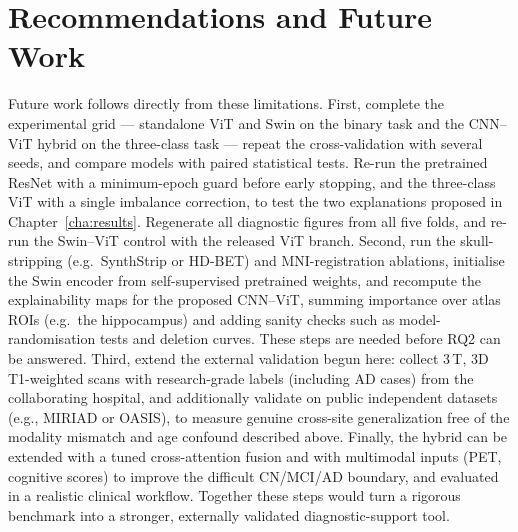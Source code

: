 \section{Recommendations and Future Work}
Future work follows directly from these limitations. First, complete the experimental grid --- standalone ViT and Swin on the binary task and the CNN--ViT hybrid on the three-class task --- repeat the cross-validation with several seeds, and compare models with paired statistical tests. Re-run the pretrained ResNet with a minimum-epoch guard before early stopping, and the three-class ViT with a single imbalance correction, to test the two explanations proposed in Chapter~\ref{cha:results}. Regenerate all diagnostic figures from all five folds, and re-run the Swin--ViT control with the released ViT branch. Second, run the skull-stripping (e.g.\ SynthStrip or HD-BET) and MNI-registration ablations, initialise the Swin encoder from self-supervised pretrained weights, and recompute the explainability maps for the proposed CNN--ViT, summing importance over atlas ROIs (e.g.\ the hippocampus) and adding sanity checks such as model-randomisation tests and deletion curves. These steps are needed before RQ2 can be answered. Third, extend the external validation begun here: collect 3\,T, 3D T1-weighted scans with research-grade labels (including AD cases) from the collaborating hospital, and additionally validate on public independent datasets (e.g., MIRIAD or OASIS), to measure genuine cross-site generalization free of the modality mismatch and age confound described above. Finally, the hybrid can be extended with a tuned cross-attention fusion and with multimodal inputs (PET, cognitive scores) to improve the difficult CN/MCI/AD boundary, and evaluated in a realistic clinical workflow. Together these steps would turn a rigorous benchmark into a stronger, externally validated diagnostic-support tool.
